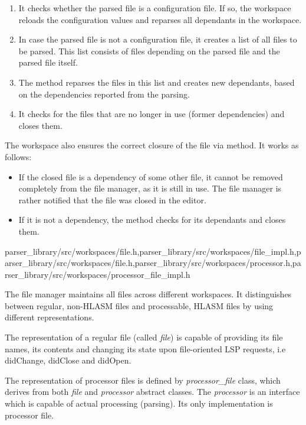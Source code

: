 \begin{enumerate}
	\item It checks whether the parsed file is a configuration file. If so, the workspace reloads the configuration values and reparses all dependants in the workspace.
	\item In case the parsed file is not a configuration file, it creates a list of all files to be parsed. This list consists of files depending on the parsed file and the parsed file itself.
	\item The method reparses the files in this list and creates new dependants, based on the dependencies reported from the parsing.
	\item It checks for the files that are no longer in use (former dependencies) and closes them.
\end{enumerate}

The workspace also ensures the correct closure of the file via  method. It works as follows:

\begin{itemize}
	\item If the closed file is a dependency of some other file, it cannot be removed completely from the file manager, as it is still in use. The file manager is rather notified that the file was closed in the editor.
	\item If it is not a dependency, the method checks for its dependants and closes them. 
\end{itemize}                        

{parser\_library/src/workspaces/file.h,parser\_library/src/workspaces/file\_impl.h,parser\_library/src/workspaces/file.h,parser\_library/src/workspaces/processor.h,parser\_library/src/workspaces/processor\_file\_impl.h}

The file manager maintains all files across different workspaces. It distinguishes between regular, non-HLASM files and processable, HLASM files by using different representations.

The representation of a regular file (called \emph{file}) is capable of providing its file names, its contents and changing its state upon file-oriented LSP requests, i.e didChange, didClose and didOpen.

The representation of processor files is defined by \emph{processor\_file} class, which derives from both \emph{file} and \emph{processor} abstract classes. The \emph{processor} is an interface which is capable of actual processing (parsing). Its only implementation is processor file.


